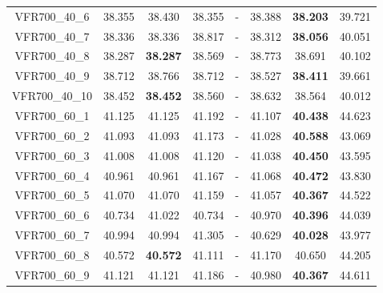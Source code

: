 \begin{tabular}{cc|ccc|ccc}
VFR700\_40\_6      & 38.355           & 38.430           & 38.355           & -                & 38.388           & {\bf 38.203}     & 39.721          \\ 
VFR700\_40\_7      & 38.336           & 38.336           & 38.817           & -                & 38.312           & {\bf 38.056}     & 40.051          \\ 
VFR700\_40\_8      & 38.287           & {\bf 38.287}     & 38.569           & -                & 38.773           & 38.691           & 40.102          \\ 
VFR700\_40\_9      & 38.712           & 38.766           & 38.712           & -                & 38.527           & {\bf 38.411}     & 39.661          \\ 
VFR700\_40\_10     & 38.452           & {\bf 38.452}     & 38.560           & -                & 38.632           & 38.564           & 40.012          \\ 
VFR700\_60\_1      & 41.125           & 41.125           & 41.192           & -                & 41.107           & {\bf 40.438}     & 44.623          \\ 
VFR700\_60\_2      & 41.093           & 41.093           & 41.173           & -                & 41.028           & {\bf 40.588}     & 43.069          \\ 
VFR700\_60\_3      & 41.008           & 41.008           & 41.120           & -                & 41.038           & {\bf 40.450}     & 43.595          \\ 
VFR700\_60\_4      & 40.961           & 40.961           & 41.167           & -                & 41.068           & {\bf 40.472}     & 43.830          \\ 
VFR700\_60\_5      & 41.070           & 41.070           & 41.159           & -                & 41.057           & {\bf 40.367}     & 44.522          \\ 
VFR700\_60\_6      & 40.734           & 41.022           & 40.734           & -                & 40.970           & {\bf 40.396}     & 44.039          \\ 
VFR700\_60\_7      & 40.994           & 40.994           & 41.305           & -                & 40.629           & {\bf 40.028}     & 43.977          \\ 
VFR700\_60\_8      & 40.572           & {\bf 40.572}     & 41.111           & -                & 41.170           & 40.650           & 44.205          \\ 
VFR700\_60\_9      & 41.121           & 41.121           & 41.186           & -                & 40.980           & {\bf 40.367}     & 44.611          \\ 

\end{tabular}
